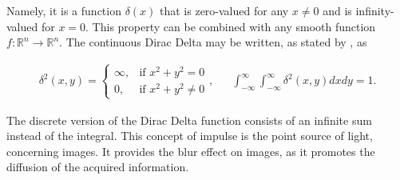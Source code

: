 Namely, it is a function $\delta(x)$ that is zero-valued for any $x \neq 0$ and is infinity-valued for $x = 0$. This property can be combined with any smooth function $f\colon \mathbb{R}^{n} \to \mathbb{R}^{n}$.
The continuous Dirac Delta may be written, as stated by , as

\begin{align}
\label{eqn:dirac_delta_function}
\delta^{2}(x,y)= 
\begin{cases}
    \infty, & \text{if } x^{2} + y^{2} =0\\
    0, & \text{if } x^{2} + y^{2} \neq 0
\end{cases},
&&
\int_{-\infty}^{\infty}
\int_{-\infty}^{\infty}
\delta^{2}(x,y)dxdy = 1.
\end{align}

\noindent The discrete version of the Dirac Delta function consists of an infinite sum instead of the integral. This concept of impulse is the point source of light, concerning images. It provides the blur effect on images, as it promotes the diffusion of the acquired information.